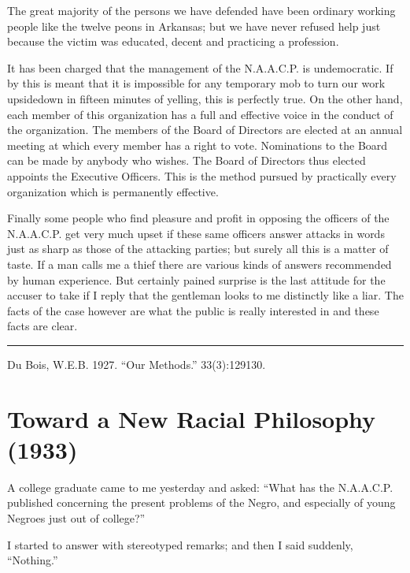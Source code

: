 \documentclass[letterpaper,10pt,english]{jupyterBook}
\begin{document}
\sphinxAtStartPar
The great majority of the persons we have defended have been ordinary working people like the twelve peons in Arkansas; but we have never refused help just because the victim was educated, decent and practicing a profession.

\sphinxAtStartPar
It has been charged that the management of the N.A.A.C.P. is undemocratic. If by this is meant that it is impossible for any temporary mob to turn our work up\sphinxhyphen{}side\sphinxhyphen{}down in fifteen minutes of yelling, this is perfectly true. On the other hand, each member of this organization has a full and effective voice in the conduct of the organization. The members of the Board of Directors are elected at an annual meeting at which every member has a right to vote. Nominations to the Board can be made by anybody who wishes. The Board of Directors thus elected appoints the Executive Officers. This is the method pursued by practically every organization which is permanently effective.

\sphinxAtStartPar
Finally some people who find pleasure and profit in opposing the officers of the N.A.A.C.P. get very much up\sphinxhyphen{}set if these same officers answer attacks in words just as sharp as those of the attacking parties; but surely all this is a matter of taste. If a man calls me a thief there are various kinds of answers recommended by human experience. But certainly pained surprise is the last attitude for the accuser to take if I reply that the gentleman looks to me distinctly like a liar. The facts of the case however are what the public is really interested in and these facts are clear.


\bigskip\hrule\bigskip


\sphinxAtStartPar
{} Du Bois, W.E.B. 1927. “Our Methods.”  33(3):129\sphinxhyphen{}130.


\section{Toward a New Racial Philosophy (1933)}
\label{\detokenize{Volumes/40/01/toward_a_new_racial_philosophy:toward-a-new-racial-philosophy-1933}}\label{\detokenize{Volumes/40/01/toward_a_new_racial_philosophy::doc}}
\sphinxAtStartPar
A college graduate came to me yesterday and asked: “What has the N.A.A.C.P. published concerning the present problems of the Negro, and especially of young Negroes just out of college?”

\sphinxAtStartPar
I started to answer with stereotyped remarks; and then I said suddenly, “Nothing.”
\end{document}
